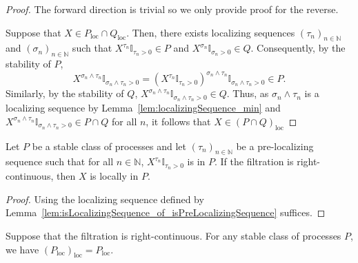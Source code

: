 \begin{proof}\leanok
The forward direction is trivial so we only provide proof for the reverse.

Suppose that $X \in P_{\mathrm{loc}}\cap Q_{\mathrm{loc}}$. Then, there exists localizing sequences $(\tau_n)_{n \in \mathbb{N}}$ and $(\sigma_n)_{n \in \mathbb{N}}$ such that $X^{\tau_n} \mathbb{I}_{\tau_n > 0}\in P$ and $X^{\sigma_n} \mathbb{I}_{\sigma_n > 0} \in Q$. Consequently, by the stability of $P$,
\[X^{\sigma_n \wedge \tau_n} \mathbb{I}_{\sigma_n \wedge \tau_n > 0} = (X^{\tau_n} \mathbb{I}_{\tau_n > 0})^{\sigma_n \wedge \tau_n} \mathbb{I}_{\sigma_n \wedge \tau_n > 0} \in P.\]
Similarly, by the stability of $Q$, $X^{\sigma_n \wedge \tau_n} \mathbb{I}_{\sigma_n \wedge \tau_n > 0} \in Q$. Thus, as $\sigma_n \wedge \tau_n$ is a localizing sequence by Lemma~\ref{lem:localizingSequence_min} and $X^{\sigma_n \wedge \tau_n} \mathbb{I}_{\sigma_n \wedge \tau_n > 0} \in P \cap Q$ for all $n$, it follows that $X \in (P \cap Q)_{\mathrm{loc}}$
\end{proof}


\begin{lemma}\label{lem:locally_of_isPreLocalizingSequence}
  \mathlibok
Let $P$ be a stable class of processes and let $(\tau_n)_{n \in \mathbb{N}}$ be a pre-localizing sequence such that for all $n \in \mathbb{N}$, $X^{\tau_n}\mathbb{I}_{\tau_n > 0}$ is in $P$.
If the filtration is right-continuous, then $X$ is locally in $P$.
\end{lemma}

\begin{proof}\leanok
  Using the localizing sequence defined by Lemma~\ref{lem:isLocalizingSequence_of_isPreLocalizingSequence} suffices.
\end{proof}


\begin{lemma}\label{lem:locally_locally}
  \mathlibok
Suppose that the filtration is right-continuous.
For any stable class of processes $P$, we have $(P_{\mathrm{loc}})_{\mathrm{loc}} = P_{\mathrm{loc}}$.
\end{lemma}

